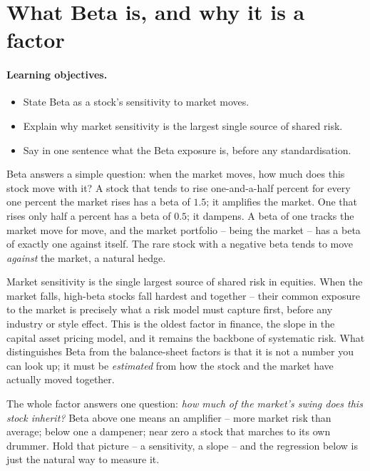 \documentclass[11pt]{article}
\theoremstyle{definition}
\theoremstyle{plain}
\theoremstyle{remark}
\begin{document}
\tableofcontents
\bigskip

\section{What Beta is, and why it is a factor}\label{sec:what}

\paragraph{Learning objectives.}
\begin{itemize}[leftmargin=1.4em,topsep=2pt]
  \item State Beta as a stock's sensitivity to market moves.
  \item Explain why market sensitivity is the largest single source of shared risk.
  \item Say in one sentence what the Beta exposure is, before any standardisation.
\end{itemize}

Beta answers a simple question: when the market moves, how much does this stock move with it? A stock that tends to rise one-and-a-half percent for every one percent the market rises has a beta of $1.5$; it amplifies the market. One that rises only half a percent has a beta of $0.5$; it dampens. A beta of one tracks the market move for move, and the market portfolio -- being the market -- has a beta of exactly one against itself. The rare stock with a negative beta tends to move \emph{against} the market, a natural hedge.

Market sensitivity is the single largest source of shared risk in equities. When the market falls, high-beta stocks fall hardest and together -- their common exposure to the market is precisely what a risk model must capture first, before any industry or style effect. This is the oldest factor in finance, the slope in the capital asset pricing model, and it remains the backbone of systematic risk. What distinguishes Beta from the balance-sheet factors is that it is not a number you can look up; it must be \emph{estimated} from how the stock and the market have actually moved together.

\begin{intuition}
The whole factor answers one question: \emph{how much of the market's swing does this stock inherit?} Beta above one means an amplifier -- more market risk than average; below one a dampener; near zero a stock that marches to its own drummer. Hold that picture -- a sensitivity, a slope -- and the regression below is just the natural way to measure it.
\end{intuition}
\end{document}
